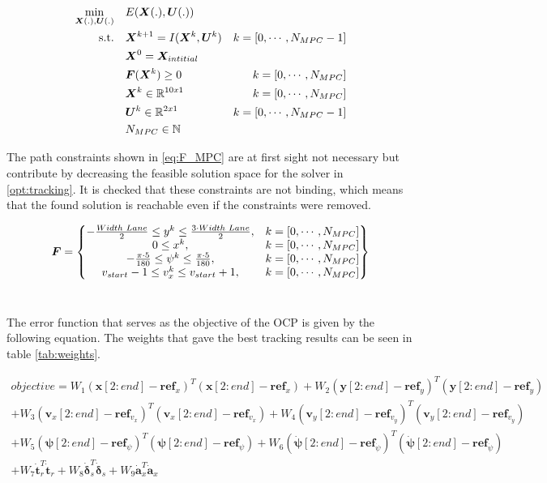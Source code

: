 \begin{equation}\label{opt:tracking}
\begin{aligned}
\min_{\bm{X}(.),\bm{U}(.)} \quad &  E(\bm{X}(.),\bm{U}(.)) \\
\textrm{s.t.} \quad & \bm{X}^{k+1} = I(\bm{X}^{k}, \bm{U}^{k}) & k = [0,\cdots, N_{MPC}-1]\\
& \bm{X}^{0} = \bm{X}_{intitial} \\
& \bm{F}(\bm{X}^{k}) \geq 0	& k = [0,\cdots, N_{MPC}]\\
& \bm{X}^{k}\in \mathbb{R}^{10x1}  & k = [0,\cdots, N_{MPC}]\\
& \bm{U}^{k}\in \mathbb{R}^{2x1} \hspace{3 mm} & k = [0,\cdots, N_{MPC}-1]\\
&  N_{MPC} \in \mathbb{N}
\end{aligned}
\end{equation}

The path constraints shown in \ref{eq:F_MPC} are at first sight not necessary but contribute by decreasing the feasible solution space for the solver in \ref{opt:tracking}. It is checked that these constraints are not binding, which means that the found solution is reachable even if the constraints were removed. 

\begin{equation}\label{eq:F_MPC}
\bm{F} =
\begin{Bmatrix}
-\frac{Width\hspace{1mm}Lane}{2} \leq y^k \leq \frac{3\cdot Width\hspace{1mm}Lane}{2}, & k = [0,\cdots, N_{MPC}] \\
0 \leq x^k, & k = [0,\cdots, N_{MPC}] \\
-\frac{\pi\cdot 5}{180} \leq \psi^k \leq \frac{\pi\cdot 5}{180}, & k = [0,\cdots, N_{MPC}] \\
v_{start}-1 \leq v_x^k \leq v_{start}+1, & k = [0,\cdots, N_{MPC}]
\end{Bmatrix}
\end{equation}\

The error function that serves as the objective of the OCP is given by the following equation. The weights that gave the best tracking results can be seen in table \ref{tab:weights}.

\begin{multline*} 
objective=W_1(\bm{x}[2:end]-\bm{ref}_x)^T(\bm{x}[2:end]-\bm{ref}_x)+W_2(\bm{y}[2:end]-\bm{ref}_y)^T(\bm{y}[2:end]-\bm{ref}_y)\\
+W_3(\bm{v}_x[2:end]-\bm{ref}_{v_x})^T(\bm{v}_x[2:end]-\bm{ref}_{v_x})+W_4(\bm{v}_y[2:end]-\bm{ref}_{v_y})^T(\bm{v}_y[2:end]-\bm{ref}_{v_y})\\+W_5(\bm{\psi}[2:end]-\bm{ref}_{\psi})^T(\bm{\psi}[2:end]-\bm{ref}_\psi)
+W_6(\bm{\dot{\psi}}[2:end]-\bm{ref}_{\dot{\psi}})^T(\bm{\dot{\psi}}[2:end]-\bm{ref}_{\dot{\psi}})\\ + W_7\dot{\bm{t}}_r^T\dot{\bm{t}}_r+W_8\dot{\bm{\delta}}_s^T\dot{\bm{\delta}}_s + W_9\dot{\bm{a}}_x^T\dot{\bm{a}}_x
\end{multline*}

